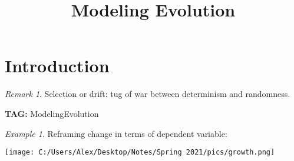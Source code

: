 \documentclass[11pt]{article}
\title{Modeling Evolution}
\theoremstyle{remark}
\newtheorem{remark}{Remark}
\newtheorem{example}{Example}
\begin{document}
\maketitle

\section{Introduction}

\begin{remark}
	Selection or drift: tug of war between determinism and randomness.
\end{remark}

\textbf{TAG:} ModelingEvolution

\begin{example}
	Reframing change in terms of dependent variable:
	
	\texttt{[image: C:/Users/Alex/Desktop/Notes/Spring 2021/pics/growth.png]}
\end{example}
\end{document}
